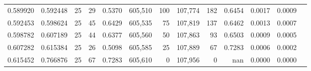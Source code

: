\begin{tabular}{rrrrrrrrrrrrr}
0.589920 & 0.592448 &    25 &  29 &                                     0.5370 & 605,510 &     100 & 107,774 &     182 & 0.6454 & 0.0017 & 0.0009 \\
0.592453 & 0.598624 &    25 &  45 &                                     0.6429 & 605,535 &      75 & 107,819 &     137 & 0.6462 & 0.0013 & 0.0007 \\
0.598782 & 0.607189 &    25 &  44 &                                     0.6377 & 605,560 &      50 & 107,863 &      93 & 0.6503 & 0.0009 & 0.0005 \\
0.607282 & 0.615384 &    25 &  26 &                                     0.5098 & 605,585 &      25 & 107,889 &      67 & 0.7283 & 0.0006 & 0.0002 \\
0.615452 & 0.766876 &    25 &  67 &                                     0.7283 & 605,610 &       0 & 107,956 &       0 &    nan & 0.0000 & 0.0000 \\
\bottomrule
\end{tabular}
